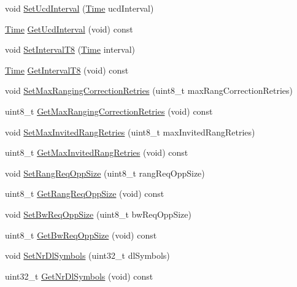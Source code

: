 \begin{DoxyCompactItemize}
\item 
void \hyperlink{classns3_1_1BaseStationNetDevice_a1896b839f0841674d6f625e584258aee}{Set\+Ucd\+Interval} (\hyperlink{classns3_1_1Time}{Time} ucd\+Interval)
\item 
\hyperlink{classns3_1_1Time}{Time} \hyperlink{classns3_1_1BaseStationNetDevice_a243e57353bdb33661ebe3c11ac9caf3c}{Get\+Ucd\+Interval} (void) const 
\item 
void \hyperlink{classns3_1_1BaseStationNetDevice_a6c903218d294b9ebd4960b4a6d954ba5}{Set\+Interval\+T8} (\hyperlink{classns3_1_1Time}{Time} interval)
\item 
\hyperlink{classns3_1_1Time}{Time} \hyperlink{classns3_1_1BaseStationNetDevice_aec24bb5b99a70a4214636c14e688f10c}{Get\+Interval\+T8} (void) const 
\item 
void \hyperlink{classns3_1_1BaseStationNetDevice_a5202fb3b9f83342bff19424df94942db}{Set\+Max\+Ranging\+Correction\+Retries} (uint8\+\_\+t max\+Rang\+Correction\+Retries)
\item 
uint8\+\_\+t \hyperlink{classns3_1_1BaseStationNetDevice_a4fb4a490c641a0e22ee45742f02a39c9}{Get\+Max\+Ranging\+Correction\+Retries} (void) const 
\item 
void \hyperlink{classns3_1_1BaseStationNetDevice_a9eb9480754d3c8569c171571e72ae376}{Set\+Max\+Invited\+Rang\+Retries} (uint8\+\_\+t max\+Invited\+Rang\+Retries)
\item 
uint8\+\_\+t \hyperlink{classns3_1_1BaseStationNetDevice_abac42ce0bd1d9fbfd8b7a1900982ac15}{Get\+Max\+Invited\+Rang\+Retries} (void) const 
\item 
void \hyperlink{classns3_1_1BaseStationNetDevice_a18b2299fbf0343a958f8ced2565211fa}{Set\+Rang\+Req\+Opp\+Size} (uint8\+\_\+t rang\+Req\+Opp\+Size)
\item 
uint8\+\_\+t \hyperlink{classns3_1_1BaseStationNetDevice_ae0acc0e22045ec42b7e636d63920e6eb}{Get\+Rang\+Req\+Opp\+Size} (void) const 
\item 
void \hyperlink{classns3_1_1BaseStationNetDevice_a15e99613d0e8b0fa3017244b14b13963}{Set\+Bw\+Req\+Opp\+Size} (uint8\+\_\+t bw\+Req\+Opp\+Size)
\item 
uint8\+\_\+t \hyperlink{classns3_1_1BaseStationNetDevice_a6b179c4e0445fd6ba8e8c7b10e2a16ac}{Get\+Bw\+Req\+Opp\+Size} (void) const 
\item 
void \hyperlink{classns3_1_1BaseStationNetDevice_a4432114996159479b03d7735d5716bf7}{Set\+Nr\+Dl\+Symbols} (uint32\+\_\+t dl\+Symbols)
\item 
uint32\+\_\+t \hyperlink{classns3_1_1BaseStationNetDevice_ad808359179fdce19284018b42948ff28}{Get\+Nr\+Dl\+Symbols} (void) const 

\end{DoxyCompactItemize}
